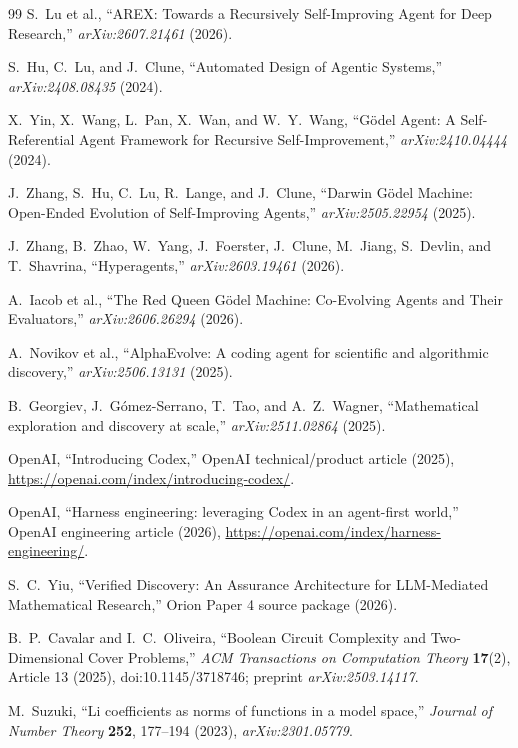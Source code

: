 \begin{thebibliography}{99}
S.~Lu et al.,
``AREX: Towards a Recursively Self-Improving Agent for Deep Research,''
\emph{arXiv:2607.21461} (2026).

S.~Hu, C.~Lu, and J.~Clune,
``Automated Design of Agentic Systems,''
\emph{arXiv:2408.08435} (2024).

X.~Yin, X.~Wang, L.~Pan, X.~Wan, and W.~Y.~Wang,
``G\"odel Agent: A Self-Referential Agent Framework for Recursive Self-Improvement,''
\emph{arXiv:2410.04444} (2024).

J.~Zhang, S.~Hu, C.~Lu, R.~Lange, and J.~Clune,
``Darwin G\"odel Machine: Open-Ended Evolution of Self-Improving Agents,''
\emph{arXiv:2505.22954} (2025).

J.~Zhang, B.~Zhao, W.~Yang, J.~Foerster, J.~Clune, M.~Jiang, S.~Devlin, and T.~Shavrina,
``Hyperagents,''
\emph{arXiv:2603.19461} (2026).

A.~Iacob et al.,
``The Red Queen G\"odel Machine: Co-Evolving Agents and Their Evaluators,''
\emph{arXiv:2606.26294} (2026).

A.~Novikov et al.,
``AlphaEvolve: A coding agent for scientific and algorithmic discovery,''
\emph{arXiv:2506.13131} (2025).

B.~Georgiev, J.~G\'omez-Serrano, T.~Tao, and A.~Z.~Wagner,
``Mathematical exploration and discovery at scale,''
\emph{arXiv:2511.02864} (2025).

OpenAI,
``Introducing Codex,''
OpenAI technical/product article (2025),
\url{https://openai.com/index/introducing-codex/}.

OpenAI,
``Harness engineering: leveraging Codex in an agent-first world,''
OpenAI engineering article (2026),
\url{https://openai.com/index/harness-engineering/}.

S.~C.~Yiu,
``Verified Discovery: An Assurance Architecture for LLM-Mediated Mathematical Research,''
Orion Paper 4 source package (2026).

B.~P.~Cavalar and I.~C.~Oliveira,
``Boolean Circuit Complexity and Two-Dimensional Cover Problems,''
\emph{ACM Transactions on Computation Theory} \textbf{17}(2), Article 13 (2025),
doi:10.1145/3718746; preprint \emph{arXiv:2503.14117}.

M.~Suzuki,
``Li coefficients as norms of functions in a model space,''
\emph{Journal of Number Theory} \textbf{252}, 177--194 (2023),
\emph{arXiv:2301.05779}.


\end{thebibliography}

